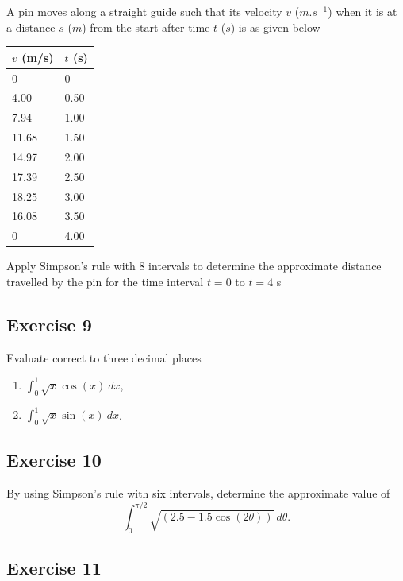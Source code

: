 \documentclass[
  english,
  11pt,
  oneside]{book}
\providecommand{\tightlist}{%
  \setlength{\itemsep}{0pt}\setlength{\parskip}{0pt}}
\newcommand{\slide}{}
\theoremstyle{definition}
\theoremstyle{definition}
\theoremstyle{definition}
\theoremstyle{definition}
\theoremstyle{remark}
\begin{document}
A pin moves along a straight guide such that its velocity \(v\) (\(m.s^{-1}\)) when it is at a distance \(s\) (\(m\)) from the start after time \(t\) (\(s\)) is as given below

\begin{tabular}{l|l}
\hline
$v$ (m/s) & $t$ (s)\\
\hline
0 & 0\\
\hline
4.00 & 0.50\\
\hline
7.94 & 1.00\\
\hline
11.68 & 1.50\\
\hline
14.97 & 2.00\\
\hline
17.39 & 2.50\\
\hline
18.25 & 3.00\\
\hline
16.08 & 3.50\\
\hline
0 & 4.00\\
\hline
\end{tabular}

Apply Simpson's rule with 8 intervals to determine the approximate distance travelled by the pin for the time interval \(t = 0\) to \(t = 4\) s

\slide

\subsection*{Exercise 9}\label{exercise-9}

Evaluate correct to three decimal places

\begin{enumerate}
\def\labelenumi{\roman{enumi}.}
\tightlist
\item
  \(\displaystyle\int_0^1\sqrt{x}\cos(x)\ dx\),
\item
  \(\displaystyle\int_0^1\sqrt{x}\sin(x)\ dx\).
\end{enumerate}

\slide

\subsection*{Exercise 10}\label{exercise-10}

By using Simpson's rule with six intervals, determine the approximate value of
\[\int_0^{\pi/2}\sqrt{(2.5-1.5\cos(2\theta))}\ d\theta.\]

\slide

\subsection*{Exercise 11}\label{exercise-11}
\end{document}
